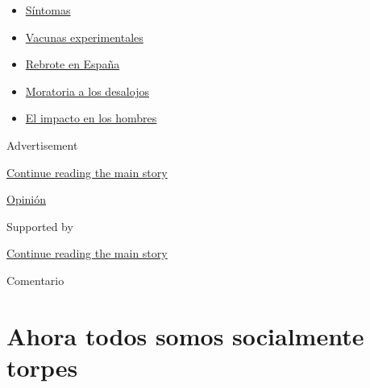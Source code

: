 \begin{itemize}
\tightlist
\item
  \href{https://www.nytimes3xbfgragh.onion/es/interactive/2020/08/06/espanol/ciencia-y-tecnologia/tengo-covid-19-sintomas.html?name=styln-coronavirus-es\&region=TOP_BANNER\&block=storyline_menu_recirc\&action=click\&pgtype=Article\&impression_id=fba36711-f2af-11ea-a5f1-d358cc56c051\&variant=undefined}{Síntomas}
\item
  \href{https://www.nytimes3xbfgragh.onion/es/2020/09/02/espanol/ciencia-y-tecnologia/vacunas-experimentales-coronavirus.html?name=styln-coronavirus-es\&region=TOP_BANNER\&block=storyline_menu_recirc\&action=click\&pgtype=Article\&impression_id=fba38e20-f2af-11ea-a5f1-d358cc56c051\&variant=undefined}{Vacunas
  experimentales}
\item
  \href{https://www.nytimes3xbfgragh.onion/es/2020/08/31/espanol/mundo/rebrote-espana.html?name=styln-coronavirus-es\&region=TOP_BANNER\&block=storyline_menu_recirc\&action=click\&pgtype=Article\&impression_id=fba38e21-f2af-11ea-a5f1-d358cc56c051\&variant=undefined}{Rebrote
  en España}
\item
  \href{https://www.nytimes3xbfgragh.onion/es/2020/09/02/espanol/negocios/desalojos-trump.html?name=styln-coronavirus-es\&region=TOP_BANNER\&block=storyline_menu_recirc\&action=click\&pgtype=Article\&impression_id=fba38e22-f2af-11ea-a5f1-d358cc56c051\&variant=undefined}{Moratoria
  a los desalojos}
\item
  \href{https://www.nytimes3xbfgragh.onion/es/2020/08/26/espanol/ciencia-y-tecnologia/coronavirus-afecta-hombres.html?name=styln-coronavirus-es\&region=TOP_BANNER\&block=storyline_menu_recirc\&action=click\&pgtype=Article\&impression_id=fba38e23-f2af-11ea-a5f1-d358cc56c051\&variant=undefined}{El
  impacto en los hombres}
\end{itemize}

Advertisement

\protect\hyperlink{after-top}{Continue reading the main story}

\href{/es/section/opinion}{Opinión}

Supported by

\protect\hyperlink{after-sponsor}{Continue reading the main story}

Comentario

\hypertarget{ahora-todos-somos-socialmente-torpes}{%
\section{Ahora todos somos socialmente
torpes}\label{ahora-todos-somos-socialmente-torpes}}

